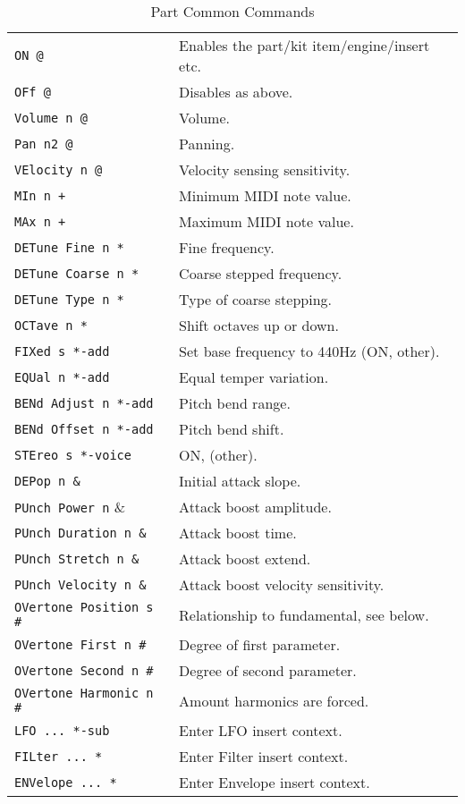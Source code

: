    \begin{table}[H]
      \centering
      \caption{Part Common Commands}
      \label{table:yoshimi_part_common_commands}
      \begin{tabular}{l l}

\texttt{ON @} &
   Enables the part/kit item/engine/insert etc. \\
\texttt{OFf @} &
   Disables as above.   \\
\texttt{Volume n @} &
   Volume.  \\
\texttt{Pan n2 @} &
   Panning. \\
\texttt{VElocity n @} &
   Velocity sensing sensitivity. \\
\texttt{MIn n +} &
   Minimum MIDI note value.   \\
\texttt{MAx n +} &
   Maximum MIDI note value.   \\
\texttt{DETune Fine n *} &
   Fine frequency.   \\
\texttt{DETune Coarse n *} &
   Coarse stepped frequency.  \\
\texttt{DETune Type n *} &
   Type of coarse stepping.   \\
\texttt{OCTave n *} &
   Shift octaves up or down.  \\
\texttt{FIXed s *-add} &
   Set base frequency to 440Hz (ON, other).  \\
\texttt{EQUal n *-add} &
   Equal temper variation. \\
\texttt{BENd Adjust n  *-add} &
   Pitch bend range. \\
\texttt{BENd Offset n  *-add} &
   Pitch bend shift. \\
\texttt{STEreo s *-voice} &
   ON, (other).   \\
\texttt{DEPop n \&} &
   Initial attack slope.   \\
\texttt{PUnch Power n} \& &
   Attack boost amplitude. \\
\texttt{PUnch Duration n \&} &
   Attack boost time.   \\
\texttt{PUnch Stretch n \&} &
   Attack boost extend. \\
\texttt{PUnch Velocity n \&} &
   Attack boost velocity sensitivity.  \\
\texttt{OVertone Position s \#} &
   Relationship to fundamental, see below. \\
\texttt{OVertone First n \#} &
   Degree of first parameter. \\
\texttt{OVertone Second n \#} &
   Degree of second parameter.   \\
\texttt{OVertone Harmonic n \#} &
   Amount harmonics are forced.  \\
\texttt{LFO ... *-sub} &
   Enter LFO insert context.  \\
\texttt{FILter ... *} &
   Enter Filter insert context.  \\
\texttt{ENVelope ... *} &
   Enter Envelope insert context.   \\

      \end{tabular}
   \end{table}

